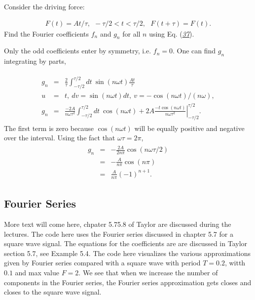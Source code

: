 \documentclass[letterpaper,10pt,english]{sphinxmanual}
\begin{document}
Consider the driving force:




\begin{equation*}
\begin{split}
\begin{equation}
F(t)=At/\tau,~~-\tau/2<t<\tau/2,~~~F(t+\tau)=F(t).
\label{_auto28} \tag{39}
\end{equation}
\end{split}
\end{equation*}
Find the Fourier coefficients \(f_n\) and \(g_n\) for all \(n\) using Eq. ({\hyperref[\detokenize{chapter4:eq:fourierdef2}]{\emph{37}}}).

Only the odd coefficients enter by symmetry, i.e. \(f_n=0\). One can find \(g_n\) integrating by parts,




\begin{equation*}
\begin{split}
\begin{eqnarray}
\label{eq:fouriersolution} \tag{40}
g_n&=&\frac{2}{\tau}\int_{-\tau/2}^{\tau/2}dt~\sin(n\omega t) \frac{At}{\tau}\\
\nonumber
u&=&t,~dv=\sin(n\omega t)dt,~v=-\cos(n\omega t)/(n\omega),\\
\nonumber
g_n&=&\frac{-2A}{n\omega \tau^2}\int_{-\tau/2}^{\tau/2}dt~\cos(n\omega t)
+\left.2A\frac{-t\cos(n\omega t)}{n\omega\tau^2}\right|_{-\tau/2}^{\tau/2}.
\end{eqnarray}
\end{split}
\end{equation*}
The first term is zero because \(\cos(n\omega t)\) will be equally
positive and negative over the interval. Using the fact that
\(\omega\tau=2\pi\),
\begin{equation*}
\begin{split}
\begin{eqnarray}
g_n&=&-\frac{2A}{2n\pi}\cos(n\omega\tau/2)\\
\nonumber
&=&-\frac{A}{n\pi}\cos(n\pi)\\
\nonumber
&=&\frac{A}{n\pi}(-1)^{n+1}.
\end{eqnarray}
\end{split}
\end{equation*}

\subsection{Fourier Series}
\label{\detokenize{chapter4:fourier-series}}
More text will come here, chpater 5.7\sphinxhyphen{}5.8 of Taylor are discussed
during the lectures. The code here uses the Fourier series discussed
in chapter 5.7 for a square wave signal. The equations for the
coefficients are are discussed in Taylor section 5.7, see Example
5.4. The code here visualizes the various approximations given by
Fourier series compared with a square wave with period \(T=0.2\), witth
\(0.1\) and max value \(F=2\). We see that when we increase the number of
components in the Fourier series, the Fourier series approximation gets closes and closes to the square wave signal.
\end{document}
